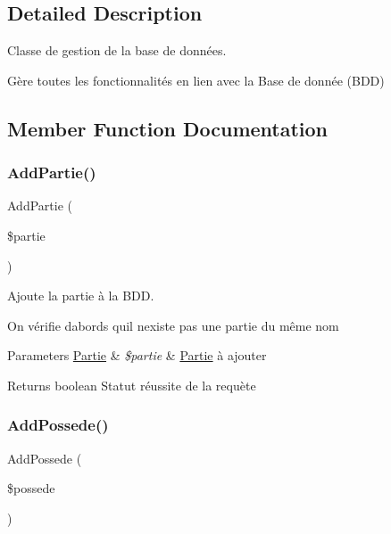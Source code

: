 \subsection{Detailed Description}
Classe de gestion de la base de données. 

Gère toutes les fonctionnalités en lien avec la Base de donnée (B\+DD) 

\subsection{Member Function Documentation}
\mbox{\label{class_interface_b_d_d_a0bbed9af515a32afda28ca2f057d02fc}} 
\subsubsection{\texorpdfstring{Add\+Partie()}{AddPartie()}}
{\footnotesize\ttfamily Add\+Partie (\begin{DoxyParamCaption}\item[{}]{\$partie }\end{DoxyParamCaption})}



Ajoute la partie à la B\+DD. 

On vérifie d\textquotesingle{}abords qu\textquotesingle{}il n\textquotesingle{}existe pas une partie du même nom


\begin{DoxyParams}[1]{Parameters}
\mbox{\hyperlink{class_partie}{Partie}} & {\em \$partie} & \mbox{\hyperlink{class_partie}{Partie}} à ajouter\\
\hline
\end{DoxyParams}
\begin{DoxyReturn}{Returns}
boolean Statut réussite de la requète 
\end{DoxyReturn}
\mbox{\label{class_interface_b_d_d_a4247c06c17b9c86dbc80321220969862}} 
\subsubsection{\texorpdfstring{Add\+Possede()}{AddPossede()}}
{\footnotesize\ttfamily Add\+Possede (\begin{DoxyParamCaption}\item[{}]{\$possede }\end{DoxyParamCaption})}



